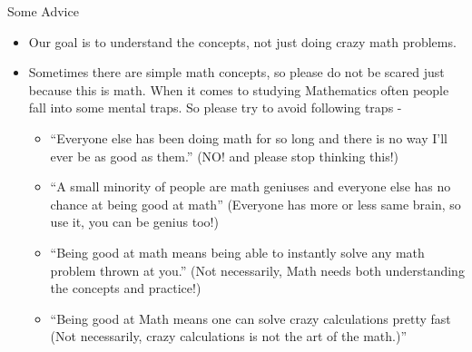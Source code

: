 \documentclass[8pt, usepdftitle=false]{beamer}
\begin{document}














\begin{frame}{Some Advice}
  
  \begin{itemize}

    \item Our goal is to understand the concepts, not just doing crazy math problems.

    \item Sometimes there are simple math concepts, so please do not be scared just because this is math.  When it comes to studying Mathematics often people fall into some mental traps. So please try to avoid following traps - 

    \vspace*{.2cm}
    \begin{itemize}
      \fontsize{8}{12}\selectfont
        
      \itshape
        \item ``Everyone else has been doing math for so long and there is no way
        I'll ever be as good as them.'' (NO! and please stop thinking this!) 

        \item ``A small minority of people are math geniuses and everyone else has no chance at being good at math'' (Everyone has more or less same brain, so use it, you can be genius too!)
        \item “Being good at math means being able to instantly solve any math problem thrown at you.” (Not necessarily, Math needs both understanding the concepts and practice!)
        \item ``Being good at Math means one can solve crazy calculations pretty fast (Not necessarily, crazy calculations is not the art of the math.)''
    \end{itemize}

      

    \end{itemize}



\end{frame}
\end{document}
